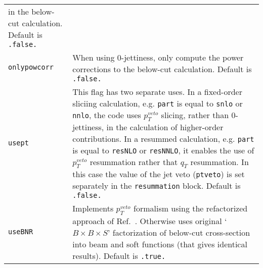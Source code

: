 \begin{longtable}{p{1.5cm}p{12cm}}
		in the below-cut calculation. Default is \texttt{.false.} \\
                \texttt{onlypowcorr} & When using 0-jettiness, only compute the power corrections
		to the below-cut calculation. Default is \texttt{.false.} \\
                \texttt{usept} & This flag has two separate uses.  In a fixed-order sliciing calculation,
		e.g. {\tt part} is equal to {\tt snlo} or {\tt nnlo}, the code uses $p_T^{veto}$ slicing, rather than
		0-jettiness, in the calculation of higher-order contributions.
		In a resummed calculation, e.g. {\tt part} is equal to {\tt resNLO} or {\tt resNNLO},
		it enables the use of $p_T^{veto}$ resummation rather that $q_T$ resummation.
		In this case the value of the jet veto (\texttt{ptveto}) is set separately in the
		\texttt{resummation} block.
		Default is \texttt{.false.} \\
                \texttt{useBNR} & Implements $p_T^{veto}$ formalism using the refactorized approach of
		Ref.~\cite{Becher:2013xia}.  Otherwise uses original `$B \times B \times S$' factorization
		of below-cut cross-section into beam and soft functions (that gives identical results).
		Default is \texttt{.true.} \\
		\hline
	\end{longtable}
